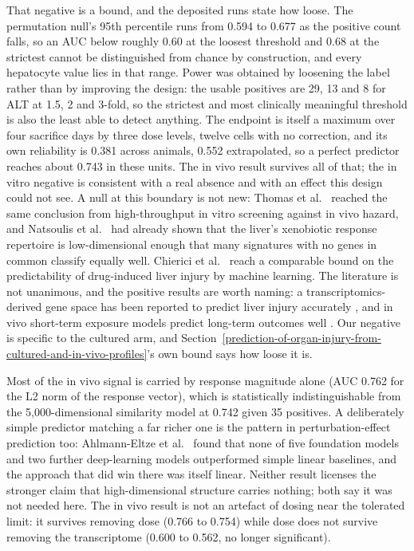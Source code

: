 \documentclass[11pt,a4paper]{article}
\begin{document}
That negative is a bound, and the deposited runs state how loose. The
permutation null's 95th percentile runs from 0.594 to 0.677 as the
positive count falls, so an AUC below roughly 0.60 at the loosest
threshold and 0.68 at the strictest cannot be distinguished from chance
by construction, and every hepatocyte value lies in that range. Power
was obtained by loosening the label rather than by improving the design:
the usable positives are 29, 13 and 8 for ALT at 1.5, 2 and 3-fold, so
the strictest and most clinically meaningful threshold is also the least
able to detect anything. The endpoint is itself a maximum over four
sacrifice days by three dose levels, twelve cells with no correction,
and its own reliability is 0.381 across animals, 0.552 extrapolated, so
a perfect predictor reaches about 0.743 in these units. The in vivo
result survives all of that; the in vitro negative is consistent with a
real absence and with an effect this design could not see. A null at
this boundary is not new: Thomas et al.~\cite{ref21} reached the same
conclusion from high-throughput in vitro screening against in vivo
hazard, and Natsoulis et al.~\cite{ref22} had already shown that the liver's
xenobiotic response repertoire is low-dimensional enough that many
signatures with no genes in common classify equally well. Chierici et
al.~\cite{ref57} reach a comparable bound on the predictability of
drug-induced liver injury by machine learning. The literature is not
unanimous, and the positive results are worth naming: a transcriptomics-
derived gene space has been reported to predict liver injury accurately
\cite{ref58}, and in vivo short-term exposure models predict long-term
outcomes well \cite{ref60}. Our negative is specific to the cultured arm,
and Section~\ref{prediction-of-organ-injury-from-cultured-and-in-vivo-profiles}'s own bound says how loose it is.

Most of the in vivo signal is carried by response magnitude alone (AUC
0.762 for the L2 norm of the response vector), which is statistically
indistinguishable from the 5,000-dimensional similarity model at 0.742
given 35 positives. A deliberately simple predictor matching a far
richer one is the pattern in perturbation-effect prediction too:
Ahlmann-Eltze et al.~\cite{ref59} found that none of five foundation models
and two further deep-learning models outperformed simple linear
baselines, and the approach that did win there was itself linear.
Neither result licenses the stronger claim that high-dimensional
structure carries nothing; both say it was not needed here. The in vivo
result is not an artefact of dosing near the tolerated limit: it
survives removing dose (0.766 to 0.754) while dose does not survive
removing the transcriptome (0.600 to 0.562, no longer significant).
\end{document}
